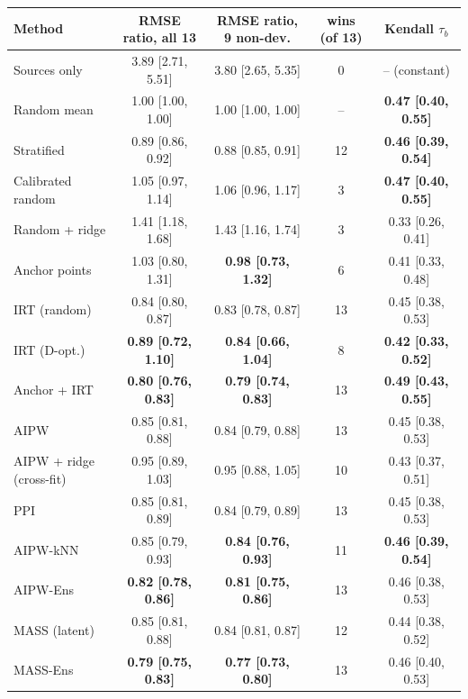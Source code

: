 \begin{tabular}{lcccc}
\toprule
Method & RMSE ratio, all 13 & RMSE ratio, 9 non-dev. & wins (of 13) & Kendall $\tau_b$ \\
\midrule
Sources only & 3.89 [2.71, 5.51] & 3.80 [2.65, 5.35] & 0 & -- (constant) \\
Random mean & 1.00 [1.00, 1.00] & 1.00 [1.00, 1.00] & -- & \textbf{0.47 [0.40, 0.55]} \\
Stratified & 0.89 [0.86, 0.92] & 0.88 [0.85, 0.91] & 12 & \textbf{0.46 [0.39, 0.54]} \\
Calibrated random & 1.05 [0.97, 1.14] & 1.06 [0.96, 1.17] & 3 & \textbf{0.47 [0.40, 0.55]} \\
Random + ridge & 1.41 [1.18, 1.68] & 1.43 [1.16, 1.74] & 3 & 0.33 [0.26, 0.41] \\
Anchor points & 1.03 [0.80, 1.31] & \textbf{0.98 [0.73, 1.32]} & 6 & 0.41 [0.33, 0.48] \\
IRT (random) & 0.84 [0.80, 0.87] & 0.83 [0.78, 0.87] & 13 & 0.45 [0.38, 0.53] \\
IRT (D-opt.) & \textbf{0.89 [0.72, 1.10]} & \textbf{0.84 [0.66, 1.04]} & 8 & \textbf{0.42 [0.33, 0.52]} \\
Anchor + IRT & \textbf{0.80 [0.76, 0.83]} & \textbf{0.79 [0.74, 0.83]} & 13 & \textbf{0.49 [0.43, 0.55]} \\
AIPW & 0.85 [0.81, 0.88] & 0.84 [0.79, 0.88] & 13 & 0.45 [0.38, 0.53] \\
AIPW + ridge (cross-fit) & 0.95 [0.89, 1.03] & 0.95 [0.88, 1.05] & 10 & 0.43 [0.37, 0.51] \\
PPI & 0.85 [0.81, 0.89] & 0.84 [0.79, 0.89] & 13 & 0.45 [0.38, 0.53] \\
AIPW-kNN & 0.85 [0.79, 0.93] & \textbf{0.84 [0.76, 0.93]} & 11 & \textbf{0.46 [0.39, 0.54]} \\
AIPW-Ens & \textbf{0.82 [0.78, 0.86]} & \textbf{0.81 [0.75, 0.86]} & 13 & 0.46 [0.38, 0.53] \\
MASS (latent) & 0.85 [0.81, 0.88] & 0.84 [0.81, 0.87] & 12 & 0.44 [0.38, 0.52] \\
MASS-Ens & \textbf{0.79 [0.75, 0.83]} & \textbf{0.77 [0.73, 0.80]} & 13 & 0.46 [0.40, 0.53] \\
\bottomrule
\end{tabular}
